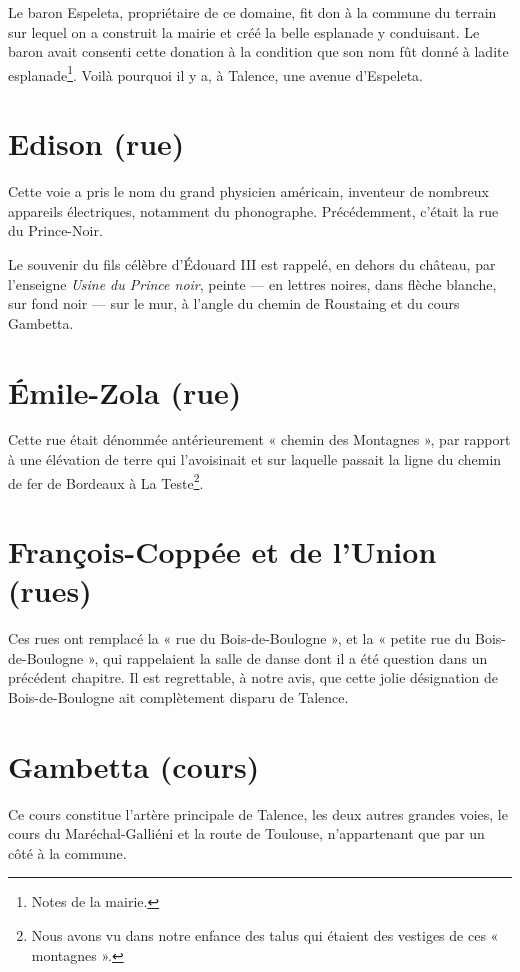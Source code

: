 \documentclass[a4paper,11pt]{book}
\begin{document}
Le baron Espeleta, propriétaire de ce domaine, fit don à la commune du terrain sur lequel on a construit la mairie et créé la belle esplanade y conduisant. Le baron avait consenti cette donation à la condition que son nom fût donné à ladite esplanade\footnote{Notes de la mairie.}. Voilà pourquoi il y a, à Talence, une avenue d'Espeleta.

\section{Edison (rue)}
Cette voie a pris le nom du grand physicien américain, inventeur de nombreux appareils électriques, notamment du phonographe. Précédemment, c'était la rue du Prince-Noir.

Le souvenir du fils célèbre d'Édouard III est rappelé, en dehors du château, par l'enseigne \textit{Usine du Prince noir}, peinte — en lettres noires, dans flèche blanche, sur fond noir — sur le mur, à l'angle du chemin de Roustaing et du cours Gambetta.

\section{Émile-Zola (rue)}

Cette rue était dénommée antérieurement « chemin des Montagnes », par rapport à une élévation de terre qui l'avoisinait et sur laquelle passait la ligne du chemin de fer de Bordeaux à La Teste\footnote{Nous avons vu dans notre enfance des talus qui étaient des vestiges de ces « montagnes ».}.

\section{François-Coppée et de l'Union (rues)}

Ces rues ont remplacé la « rue du Bois-de-Boulogne », et la « petite rue du Bois-de-Boulogne », qui rappelaient la salle de danse dont il a été question dans un précédent chapitre. Il est regrettable, à notre avis, que cette jolie désignation de Bois-de-Boulogne ait complètement disparu de Talence.

\section{Gambetta (cours)}

Ce cours constitue l'artère principale de Talence, les deux autres grandes voies, le cours du Maréchal-Galliéni et la route de Toulouse, n'appartenant que par un côté à la commune.
\end{document}
